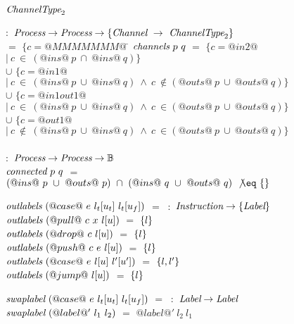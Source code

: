 
\begin{figure}

\begin{tabbing}
$\textit{ChannelType}_2$   \TABDEF \kill

 \> $:$ \> $\textit{Process} \to \textit{Process} \to \{\textit{Channel} ~\to~ \textit{ChannelType}_2\}$ \\

  \> $=$    \> $\{ c=@MMMMMMM@~$\= \kill
$\textit{channels}~p~q$
  \> $=$    \> $\{ c=@in2@$
            \> $|~c~\in~(@ins@~p~\cap~@ins@~q) \}$ \\

  \> $\cup$ \> $\{ c=@in1@$
            \> $ |~c~\in~(@ins@~p~\cup~@ins@~q)~\wedge~c~\not\in(@outs@~p~\cup~@outs@~q) \}$ \\

  \> $\cup$ \> $\{ c=@in1out1@$
            \> $|~c~\in~(@ins@~p~\cup~@ins@~q)~\wedge~c~\in(@outs@~p~\cup~@outs@~q) \}$ \\

  \> $\cup$ \> $\{ c=@out1@$
            \> $ |~c~\not\in~(@ins@~p~\cup~@ins@~q)~\wedge~c~\in(@outs@~p~\cup~@outs@~q) \}$ \\
\\

 \> $:$ \> $\textit{Process} \to \textit{Process} \to  \mathbb{B}$ \\
$\textit{connected}~p~q$
  \> $=$ \> $(@ins@~p~\cup~@outs@~p)~\cap~(@ins@~q~\cup~@outs@~q)~\not\eq~\sgl{}$ \\
\end{tabbing}

\newcommand\funClauseDef[3]
{ $\ti{#1}~(#2)$ \> $=$ \> $#3$ \\
}
\newcommand\outlabelsDef[2]
{ \funClauseDef{outlabels}{#1}{\sgl{#2}} 
}

\begin{tabbing}
$\textit{outlabels}~(@case@~e~l_t[u_t]~l_t[u_f])$ \TABSKIP $=$ \TABSKIP \kill
{} \> $~:$ \> $\textit{Instruction} \to \{ \textit{Label} \}$ \\
\outlabelsDef{@pull@~c~x~l[u]}{l}
\outlabelsDef{@drop@~c~l[u]}{l}
\outlabelsDef{@push@~c~e~l[u]}{l}
\outlabelsDef{@case@~e~l[u]~l'[u']}{l, l'}
\outlabelsDef{@jump@~l[u]}{l}
\end{tabbing}

\begin{tabbing}
$\textit{swaplabel}~(@case@~e~l_t[u_t]~l_t[u_f])$ \TABSKIP $=$ \TABSKIP \kill
{} \> $~:$ \> $\textit{Label} \to \textit{Label}$ \\
$\textit{swaplabel}~(@label@'~l_1~l_2)$ \> $=$ \> $@label@'~l_2~l_1$ \\
\end{tabbing}


\end{figure}
